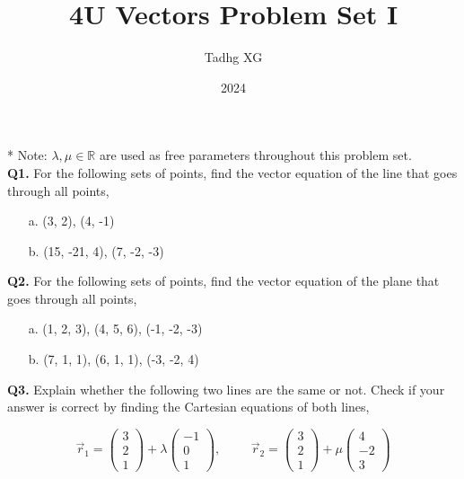 \documentclass{article}
\title{4U Vectors Problem Set I}
\author{Tadhg XG}
\date{2024}
\begin{document}
\maketitle
* Note: $\lambda, \mu \in \mathbb{R}$ are used as free parameters throughout this problem set. \\

\textbf{Q1.} For the following sets of points, find the vector equation of the line that goes through all points,
\begin{enumerate}
    \item[a.] (3, 2), (4, -1)
    \item[b.] (15, -21, 4), (7, -2, -3)
\end{enumerate}

\textbf{Q2.} For the following sets of points, find the vector equation of the plane that goes through all points,
\begin{enumerate}
    \item[a.] (1, 2, 3), (4, 5, 6), (-1, -2, -3)
    \item[b.] (7, 1, 1), (6, 1, 1), (-3, -2, 4)
\end{enumerate}

\textbf{Q3.} Explain whether the following two lines are the same or not. Check if your answer is correct by finding the Cartesian equations of both lines,

$$
\vec{r}_1 = 
\begin{pmatrix}
    3 \\ 2 \\ 1
\end{pmatrix}
+ \lambda
\begin{pmatrix}
    -1 \\ 0 \\ 1
\end{pmatrix}, \hspace{1cm}
\vec{r}_2 = 
\begin{pmatrix}
    3 \\ 2 \\ 1
\end{pmatrix}
+ \mu
\begin{pmatrix}
    4 \\ -2 \\ 3
\end{pmatrix}
$$
\end{document}
